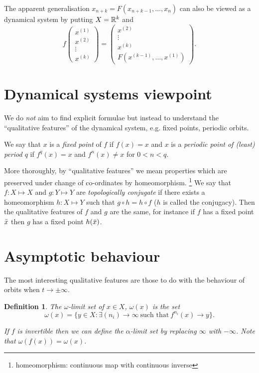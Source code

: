 \documentclass{notes}
\theoremstyle{plain}
\newtheorem{definition}[proposition]{Definition}
\begin{document}
The apparent generalisation $x_{n+k} = F(x_{n+k-1}, \dots, x_n)$ can
also be viewed as a dynamical system by putting $X = \mathbb{R}^k$ and
\[
f \begin{pmatrix}
x^{(1)} \\
x^{(2)} \\
\vdots \\
x^{(k)}
\end{pmatrix}
= \begin{pmatrix}
x^{(2)} \\
\vdots \\
x^{(k)} \\
F(x^{(k-1)}, \dots, x^{(1)})
\end{pmatrix}.
\]

\section{Dynamical systems viewpoint}

We do \emph{not} aim to find explicit formulae but instead to understand
the ``qualitative features'' of the dynamical system, e.g. fixed points,
periodic orbits.

We say that $x$ is a \emph{fixed point} of $f$ if $f(x) = x$ and $x$
is a \emph{periodic point of (least) period $q$} if $f^q(x) = x$ and
$f^n(x) \neq x$ for $0 < n < q$.

More thoroughly, by ``qualitative features'' we mean properties which are
preserved under change of co-ordinates by homeomorphism.%
\footnote{homeomorphism: continuous map with continuous inverse} We
say that $f \colon X \mapsto X$ and $g \colon Y \mapsto Y$ are
\emph{topologically conjugate} if there exists a homeomorphism $h
\colon X \mapsto Y$ such that $g \circ h = h \circ f$ ($h$ is called
the conjugacy).  Then the qualitative features of $f$ and $g$ are the
same, for instance if $f$ has a fixed point $\Bar{x}$ then $g$ has a
fixed point $h(\Bar{x})$.

\section{Asymptotic behaviour}

The most interesting qualitative features are those to do with the behaviour
of orbits when $t \to \pm \infty$.

\begin{definition}
The $\omega$-limit set of $x \in X$, $\omega(x)$ is the set
\[
\omega(x) = \{ y \in X : \exists (n_i) \to \infty\ \text{such that}\
f^{n_i}(x) \to y \}.
\]

If $f$ is invertible then we can define the $\alpha$-limit set by replacing
$\infty$ with $-\infty$.  Note that $\omega(f(x)) = \omega(x)$.
\end{definition}
\end{document}
